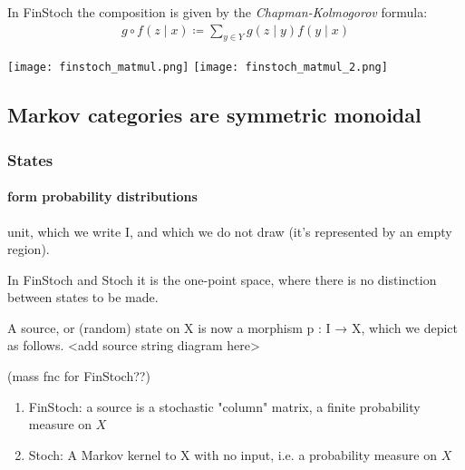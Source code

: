 \begin{frame}
    \begin{minipage}{.48\textwidth}
    In FinStoch the composition is given by the \emph{Chapman-Kolmogorov} formula:
    \begin{align*}
        g\circ f (z\mid x) \coloneqq \sum_{y\in Y} g(z\mid y) f(y\mid x)
    \end{align*}
    \end{minipage}
    \hfill
    \begin{minipage}{.45\textwidth}
        \texttt{[image: finstoch\_matmul.png]}
        \texttt{[image: finstoch\_matmul\_2.png]}
    \end{minipage}
    
\end{frame}

\subsection{Markov categories are symmetric monoidal}
\begin{frame}
    \frametitle{States}
    \framesubtitle{form probability distributions}
unit, which we write I, and which we do not draw (it’s represented by an empty region). 

In FinStoch and Stoch it is the one-point space, where there is no distinction between states to be made.

A source, or (random) state on X is now a morphism p : I → X, which we depict as follows.
<add source string diagram here>

(mass fnc for FinStoch??)
\begin{enumerate}
    \item FinStoch: a source is a stochastic "column" matrix, a finite probability measure on $X$
    \item Stoch: A Markov kernel to X with no input, i.e. a probability measure on $X$
\end{enumerate}

\end{frame}


